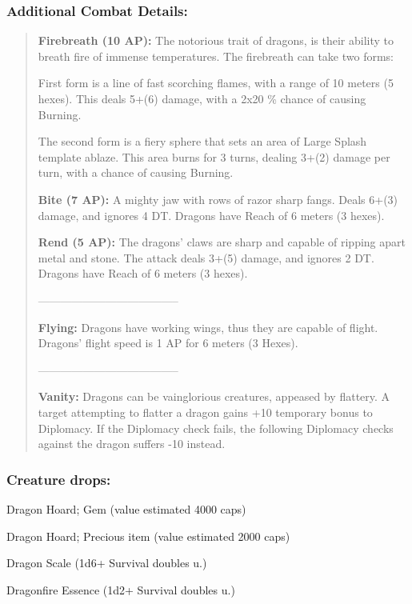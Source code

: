\documentclass[11pt,a4paper,twocolumn]{book}
\begin{document}
	\subsubsection*{Additional Combat Details:}
	\begin{verse}
		\textbf{Firebreath (10 AP):} The notorious trait of dragons, is their ability to breath fire of immense temperatures. The firebreath can take two forms: 
		
		First form is a line of fast scorching flames, with a range of 10 meters (5 hexes). This deals 5+(6) damage, with a 2x20 \% chance of causing Burning.
		
		The second form is a fiery sphere that sets an area of Large Splash template ablaze. This area burns for 3 turns, dealing 3+(2) damage per turn, with a chance of causing Burning.
		
		\textbf{Bite (7 AP):} A mighty jaw with rows of razor sharp fangs. Deals 6+(3) damage, and ignores 4 DT. Dragons have Reach of 6 meters (3 hexes).
		
		\textbf{Rend (5 AP):} The dragons' claws are sharp and capable of ripping apart metal and stone. The attack deals 3+(5) damage, and ignores 2 DT. Dragons have Reach of 6 meters (3 hexes).
		
		--------------------------------------
		
		\textbf{Flying:} Dragons have working wings, thus they are capable of flight. Dragons' flight speed is 1 AP for 6 meters (3 Hexes).
		
		--------------------------------------
		
		\textbf{Vanity:} Dragons can be vainglorious creatures, appeased by flattery. A target attempting to flatter a dragon gains +10 temporary bonus to Diplomacy. If the Diplomacy check fails, the following Diplomacy checks against the dragon suffers -10 instead.
		
	\end{verse}
	
	\subsubsection*{Creature drops:}
	\begin{compactitem}
		\item Dragon Hoard; Gem (value estimated 4000 caps)
		\item Dragon Hoard; Precious item (value estimated 2000 caps)
		\item Dragon Scale (1d6+ Survival doubles u.)
		\item Dragonfire Essence (1d2+ Survival doubles u.)
	\end{compactitem}
\end{document}
